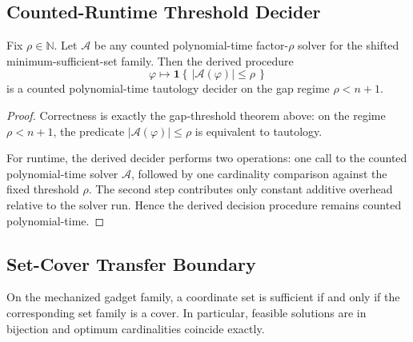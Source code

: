 \subsection{Counted-Runtime Threshold Decider}

\begin{theorem}
Fix $\rho\in\mathbb{N}$. Let $\mathcal{A}$ be any counted polynomial-time factor-$\rho$ solver for the shifted minimum-sufficient-set family. Then the derived procedure
\[
\varphi \longmapsto \mathbf{1}\!\left\{\,|\mathcal{A}(\varphi)|\le \rho\,\right\}
\]
is a counted polynomial-time tautology decider on the gap regime $\rho<n+1$.
\end{theorem}

\begin{proof}
Correctness is exactly the gap-threshold theorem above: on the regime $\rho<n+1$, the predicate $|\mathcal{A}(\varphi)|\le \rho$ is equivalent to tautology.

For runtime, the derived decider performs two operations: one call to the counted polynomial-time solver $\mathcal{A}$, followed by one cardinality comparison against the fixed threshold $\rho$. The second step contributes only constant additive overhead relative to the solver run. Hence the derived decision procedure remains counted polynomial-time.
\end{proof}

\subsection{Set-Cover Transfer Boundary}

\begin{theorem}
On the mechanized gadget family, a coordinate set is sufficient if and only if the corresponding set family is a cover. In particular, feasible solutions are in bijection and optimum cardinalities coincide exactly.
\end{theorem}

